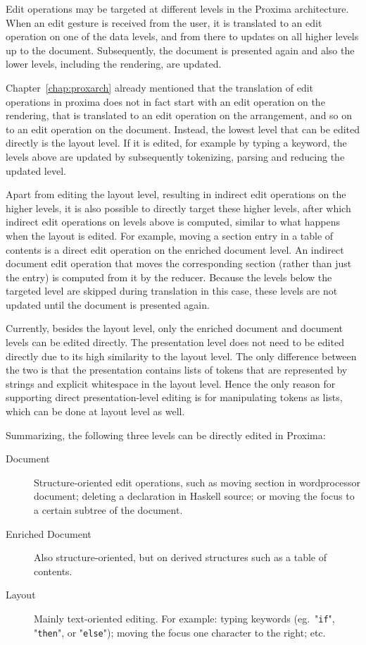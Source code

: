 
\bc Edit operations may be targeted at different levels in the Proxima architecture. When an edit gesture is received from the user, it is translated to an edit operation on one of the data levels, and from there to updates on all higher levels up to the document. Subsequently, the document is presented again and also the lower levels, including the rendering, are updated. \ec

Chapter~\ref{chap:proxarch} already mentioned that the translation of edit operations in proxima does not in fact start with an edit operation on the rendering, that is translated to an edit operation on the arrangement, and so on to an edit operation on the document. Instead, the lowest level that can be edited directly is the layout level. If it is edited, for example by typing a keyword, the levels above are updated by subsequently tokenizing, parsing and reducing the updated level.

Apart from editing the layout level, resulting in indirect edit operations on the higher levels, it is also possible to directly target these higher levels, after which indirect edit operations on levels above is computed, similar to what happens when the layout is edited. For example, moving a section entry in a table of contents is a direct edit operation on the enriched document level. An indirect document edit operation that moves the corresponding section (rather than just the entry) is computed from it by the reducer. Because the levels below the targeted level are skipped during translation in this case, these levels are not updated until the document is presented again. 

Currently, besides the layout level, only the enriched document and document levels can be edited directly. The presentation level does not need to be edited directly due to its high similarity to the layout level. The only difference between the two is that the presentation contains lists of tokens that are represented by strings and explicit whitespace in the layout level. Hence the only reason for supporting direct presentation-level editing is for manipulating tokens as lists, which can be done at layout level as well.

Summarizing, the following three levels can be directly edited in Proxima:

\begin{description}
\item[Document] Structure-oriented edit operations, such as moving section in wordprocessor document; deleting a declaration in Haskell source; or moving the focus to a certain subtree of the document.
\item[Enriched Document] Also structure-oriented, but on derived structures such as a table of contents.
\item[Layout] Mainly text-oriented editing. For example: typing keywords (eg.\ "\verb|if|", "\verb|then|", or "\verb|else|"); moving the focus one character to the right; etc.
\end{description}

